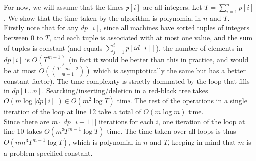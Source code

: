 \documentclass[a4paper]{article}
\newcommand{\nl}{\vspace{0.2cm}\\}
\begin{document}
For now, we will assume that the times $p[i]$ are all integers. Let $T = \sum_{i = 1}^n p[i]$. We show that the time taken by the algorithm is polynomial in $n$ and $T$.\nl
Firstly note that for any $dp[i]$, since all machines have sorted tuples of integers between $0$ to $T$, and each tuple is associated with at most one value, and the sum of tuples is constant (and
equals $\sum_{j = 1}^i p[id[i]]$), the number of elements in $dp[i]$ is $O(T^{m - 1})$ (in fact it would be better than this in practice, and would be at most $O(\binom{T + m - 2}{m - 1})$ which is asymptotically
the same but has a better constant factor).
The time complexity is strictly dominated by the loop that fills in $dp[1 \ldots n]$. Searching/inserting/deletion in a red-black tree takes $O(m \log |dp[i]|) \in O(m^2 \log T)$ time. The rest of
the operations in a single iteration of the loop at line 12 take a total of $O(m \log m)$ time.\nl
Since there are $m \cdot |dp[i - 1]|$ iterations for each $i$, one iteration of the loop at line 10 takes $O(m^3 T^{m - 1} \log T)$ time. The time taken over all loops is thus $O(n m^3 T^{m - 1}
\log T)$, which is polynomial in $n$ and $T$, keeping in mind that $m$ is a problem-specified constant.\nl
\end{document}
